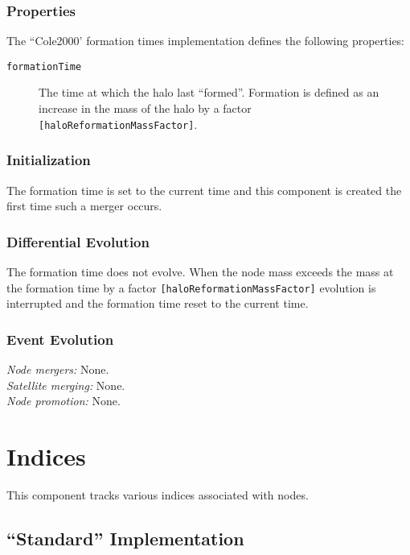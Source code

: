 \subsubsection{Properties}

The ``Cole2000' formation times implementation defines the following properties:
\begin{description}
 \item [{\tt formationTime}] The time at which the halo last ``formed''. Formation is defined as an increase in the mass of the halo by a factor {\tt [haloReformationMassFactor]}.
\end{description}

\subsubsection{Initialization}

The formation time is set to the current time and this \gls{component} is created the first time such a merger occurs.

\subsubsection{Differential Evolution}

The formation time does not evolve. When the \gls{node} mass exceeds the mass at the formation time by a factor {\tt [haloReformationMassFactor]} evolution is interrupted and the formation time reset to the current time.

\subsubsection{Event Evolution}

\noindent\emph{Node mergers:} None.\\

\noindent\emph{Satellite merging:} None.\\

\noindent\emph{Node promotion:} None.\\

\section{Indices}\label{sec:ComponentIndices}

This \gls{component} tracks various indices associated with nodes.

\subsection{``Standard'' Implementation}

